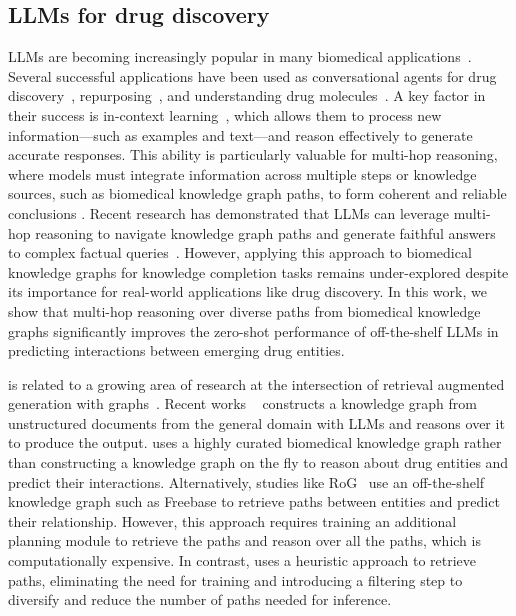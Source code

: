 \subsection{LLMs for drug discovery}
LLMs are becoming increasingly popular in many biomedical applications~\citep{chaves2024txllm,inoue2024drugagent,liang2023drugchat}.
Several successful applications have been used as conversational agents for drug discovery~\citep{chaves2024txllm}, repurposing~\citep{inoue2024drugagent}, and understanding drug molecules~\citep{liang2023drugchat}. 
A key factor in their success is in-context learning~\citep{brown2020language}, which allows them to process new information—such as examples and text—and reason effectively to generate accurate responses.
This ability is particularly valuable for multi-hop reasoning, where models must integrate information across multiple steps or knowledge sources, such as biomedical knowledge graph paths, to form coherent and reliable conclusions \cite{mavromatis2024gnnraggraphneuralretrieval}.
Recent research has demonstrated that LLMs can leverage multi-hop reasoning to navigate knowledge graph paths and generate faithful answers to complex factual queries~\cite{luo2024reasoninggraphsfaithfulinterpretable}.
However, applying this approach to biomedical knowledge graphs for knowledge completion tasks remains under-explored despite its importance for real-world applications like drug discovery.
In this work, we show that multi-hop reasoning over diverse paths from biomedical knowledge graphs significantly improves the zero-shot performance of off-the-shelf LLMs in predicting interactions between emerging drug entities.

\sys is related to a growing area of research at the intersection of retrieval augmented generation with graphs~\citep{xiong-etal-2024-benchmarking, edge2024localglobalgraphrag,luo2024reasoninggraphsfaithfulinterpretable}.
Recent works ~\citep{xiong-etal-2024-benchmarking, edge2024localglobalgraphrag, wu2024medical} constructs a knowledge graph from unstructured documents from the general domain with LLMs and reasons over it to produce the output. 
\sys uses a highly curated biomedical knowledge graph rather than constructing a knowledge graph on the fly to reason about drug entities and predict their interactions. 
Alternatively, studies like RoG~\citep{luo2024reasoninggraphsfaithfulinterpretable} use an off-the-shelf knowledge graph such as Freebase to retrieve paths between entities and predict their relationship. 
However, this approach requires training an additional planning module to retrieve the paths and reason over all the paths, which is computationally expensive. 
In contrast, \sys uses a heuristic approach to retrieve paths, eliminating the need for training and introducing a filtering step to diversify and reduce the number of paths needed for inference. 

